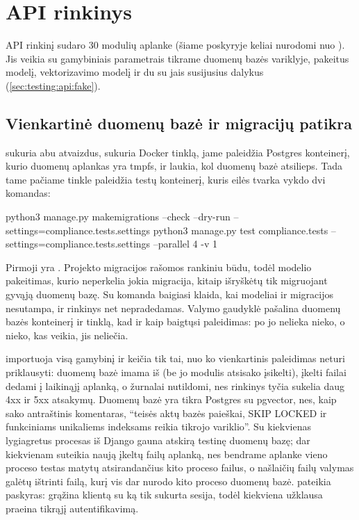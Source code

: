 \section{API rinkinys}\label{sec:testing:api}

API rinkinį sudaro 30 modulių aplanke  (šiame poskyryje keliai nurodomi nuo
). Jis veikia su gamybiniais parametrais tikrame duomenų bazės
variklyje, pakeitus modelį, vektorizavimo modelį ir du su jais susijusius dalykus
(\cref{sec:testing:api:fake}).

\subsection{Vienkartinė duomenų bazė ir migracijų patikra}\label{sec:testing:api:db}

 sukuria abu atvaizdus, sukuria Docker tinklą, jame paleidžia Postgres
konteinerį, kurio duomenų aplankas yra tmpfs, ir laukia, kol duomenų bazė atsilieps. Tada tame
pačiame tinkle paleidžia testų konteinerį, kuris eilės tvarka vykdo dvi komandas:

\begin{codeblock}
python3 manage.py makemigrations --check --dry-run --settings=compliance.tests.settings
python3 manage.py test compliance.tests --settings=compliance.tests.settings --parallel 4 -v 1
\end{codeblock}

Pirmoji yra . Projekto migracijos rašomos rankiniu būdu, todėl modelio
pakeitimas, kurio neperkelia jokia migracija, kitaip išryškėtų tik migruojant gyvąją duomenų
bazę. Su  komanda baigiasi klaida, kai modeliai ir migracijos nesutampa, ir
rinkinys net nepradedamas. Valymo gaudyklė pašalina duomenų bazės konteinerį ir tinklą, kad ir
kaip baigtųsi paleidimas: po jo nelieka nieko, o nieko, kas veikia, jis neliečia.

 importuoja visą gamybinį  ir keičia tik tai, nuo ko
vienkartinis paleidimas neturi priklausyti: duomenų bazė imama iš 
(be jo modulis atsisako įsikelti), įkelti failai dedami į laikinąjį aplanką, o žurnalai
nutildomi, nes rinkinys tyčia sukelia daug 4xx ir 5xx atsakymų. Duomenų bazė yra tikra Postgres
su pgvector, nes, kaip sako antraštinis komentaras, \enquote{teisės aktų bazės paieškai, SKIP
LOCKED ir funkciniams unikaliems indeksams reikia tikrojo variklio}. Su 
kiekvienas lygiagretus procesas iš Django gauna atskirą testinę duomenų bazę;
 dar kiekvienam suteikia naują įkeltų failų aplanką, nes bendrame aplanke
vieno proceso testas matytų atsirandančius kito proceso failus, o našlaičių failų valymas galėtų
ištrinti failą, kurį vis dar nurodo kito proceso duomenų bazė.  pateikia
paskyras:  grąžina klientą su ką tik sukurta sesija, todėl kiekviena užklausa
praeina tikrąjį autentifikavimą.

